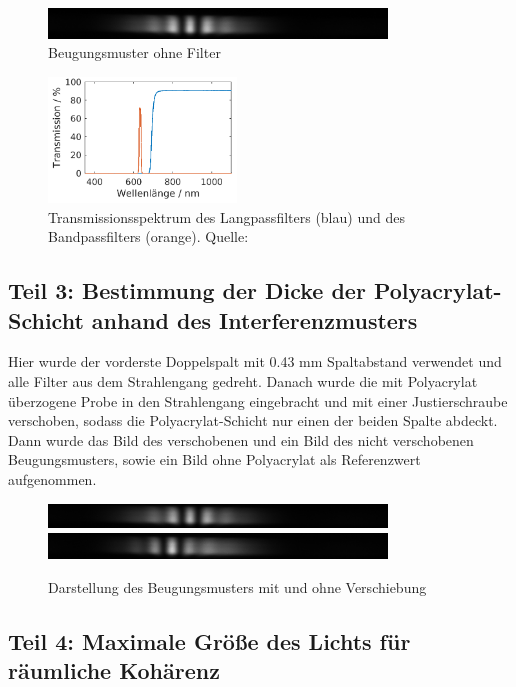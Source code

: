 \documentclass{article}
\begin{document}
\begin{figure}[H]
\centering
\caption{Beugungsmuster ohne Filter}
\includegraphics[width=9cm]{moodle/img__.png}
\end{figure}

\begin{figure}[H]
\centering
\caption{Transmissionsspektrum des Langpassfilters (blau) und des Bandpassfilters (orange). Quelle: \cite{quelle6}}
\includegraphics[width=5cm]{moodle/filter.png}
\end{figure}



\subsection{Teil 3: Bestimmung der Dicke der Polyacrylat-Schicht anhand des Interferenzmusters}

Hier wurde der vorderste Doppelspalt mit 0.43 mm Spaltabstand verwendet und alle Filter aus dem Strahlengang gedreht. Danach wurde die mit Polyacrylat überzogene Probe in den Strahlengang eingebracht und mit einer Justierschraube verschoben, sodass die Polyacrylat-Schicht nur einen der beiden Spalte abdeckt. Dann wurde das Bild des verschobenen und ein Bild des nicht verschobenen Beugungsmusters, sowie ein Bild ohne Polyacrylat als Referenzwert aufgenommen.

\begin{figure}[H]
\centering
\caption{Darstellung des Beugungsmusters mit und ohne Verschiebung}
\includegraphics[width=9cm]{moodle/img_noShift.png}
\includegraphics[width=9cm]{moodle/img_Shift.png}
\end{figure}


\subsection{Teil 4: Maximale Größe des Lichts für räumliche Kohärenz}
\end{document}
